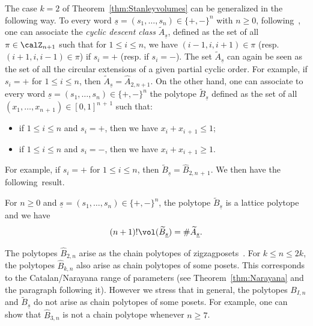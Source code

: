 The case $k=2$ of Theorem~\ref{thm:Stanleyvolumes} can be generalized in the following way. To every word $\underline{s}=(s_1,\ldots,s_n)\in \{+,-\}^n$ with $n\geq0$, following~\cite{R17}, one can associate the \emph{cyclic descent class} $\widetilde{A}_{\underline{s}}$, defined as the set of all $\pi\in\calZ_{n+1}$ such that for $1 \leq i\leq n$, we have $(i-1,i,i+1)\in \pi$ (resp. $(i+1,i,i-1)\in \pi$) if $s_i=+$ (resp. if $s_i=-$). The set $\widetilde{A}_{\underline{s}}$ can again be seen as the set of all the circular extensions of a given partial cyclic order. For example, if $s_i=+$ for $1 \leq i \leq n$, then $\widetilde{A}_{\underline{s}}=\hat{A}_{2,n+1}$. On the other hand, one can associate to every word $\underline{s}=(s_1,\ldots,s_n)\in\{+,-\}^n$ the polytope $\widetilde{B}_{\underline{s}}$ defined as the set of all $(x_1,\ldots,x_{n\,+\,1})\in[0,1]^{n\,+\,1}$ such that:
\begin{itemize}
\item if $1 \leq i \leq n$ and $s_i=+$, then we have $x_i+x_{i\,+\,1}\leq 1$;\label{list-rem-2.4.1}
\item if $1 \leq i \leq n$ and $s_i=-$, then we have $x_i+x_{i\,+\,1}\geq 1$.\label{list-rem-2.4.2}
\end{itemize}
For example, if $s_i=+$ for $1 \leq i \leq n$, then $\widetilde{B}_{\underline{s}}=\hat{B}_{2,n\,+\,1}$. We then have the following~result.

\begin{theo}\label{thm:cyclicdescents}
For $n\geq0$ and $\underline{s}=(s_1,\ldots,s_n)\in\{+,-\}^n$, the polytope $\widetilde{B}_{\underline{s}}$ is a lattice polytope and we have
\begin{equation}
(n+1)! \vol(\widetilde{B}_{\underline{s}}) = \# \widetilde{A}_{\underline{s}}.
\end{equation}
\end{theo}

\begin{rema}
The polytopes $\hat{B}_{2,n}$ arise as the chain polytopes of zigzag\linebreak posets~\cite{S86}. For $k \leq n \leq 2k$, the polytopes $\hat{B}_{k,n}$ also arise as chain polytopes of some posets. This corresponds to the Catalan/Narayana range of parameters (see Theorem~\ref{thm:Narayana} and the paragraph following it). However we stress that in general, the polytopes $B_{I,n}$ and $\widetilde{B}_{\underline{s}}$ do not arise as chain polytopes of some posets. For example, one can show that $\hat{B}_{3,n}$ is not a chain polytope whenever $n\geq7$.
\end{rema}


